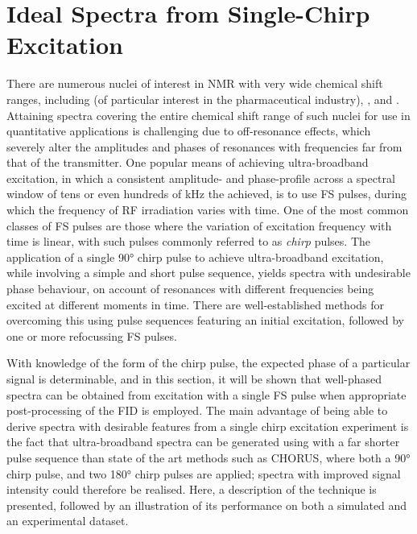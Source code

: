 \section{Ideal Spectra from Single-Chirp Excitation}
\label{sec:bbqchili}
There are numerous nuclei of interest in \ac{NMR} with very wide chemical shift
ranges, including  (of particular interest in the pharmaceutical
industry), , and .
Attaining spectra covering the entire chemical shift range of such nuclei for
use in quantitative applications is challenging due to off-resonance effects,
which severely alter the amplitudes and phases of resonances with frequencies
far from that of the transmitter\cite[Section 3.4.1]{Cavanagh2007}. One
popular means of achieving ultra-broadband excitation, in which a consistent
amplitude- and phase-profile across a spectral window of tens or even hundreds
of \unit{\kilo\hertz} the achieved, is to use \ac{FS} pulses, during
which the frequency of \ac{RF} irradiation varies with
time\cite{Foroozandeh2020}. One of the most common classes of \ac{FS} pulses
are those where the variation of excitation frequency with time is linear, with
such pulses commonly referred to as \emph{chirp} pulses. The application of a
single \ang{90} chirp pulse to achieve ultra-broadband excitation, while
involving a simple and short pulse sequence, yields
spectra with undesirable phase behaviour, on account of resonances with
different frequencies being excited at different moments in time.
There are well-established methods for overcoming this using
pulse sequences featuring an initial excitation, followed by one or more
refocussing \ac{FS}
pulses\cite{Bohlen1989,Bohlen1993,Cano2002,Power2016,Foroozandeh2019}.

With knowledge of the form of the chirp pulse, the expected phase of a
particular signal is determinable, and in this section, it will be shown
that well-phased spectra can be obtained from excitation with a single \ac{FS}
pulse when appropriate post-processing of the \ac{FID} is employed.
The main advantage of being able to derive spectra with desirable features from
a single chirp excitation experiment is the fact that ultra-broadband spectra
can be generated using with a far shorter pulse sequence than state of the art
methods such as \ac{CHORUS}\cite{Power2016,Foroozandeh2019}, where both a
\ang{90} chirp pulse, and two \ang{180} chirp pulses are applied; spectra with
improved signal intensity could therefore be realised. Here, a description of the
technique is presented, followed by an illustration of its performance on both a
simulated and an experimental dataset.

